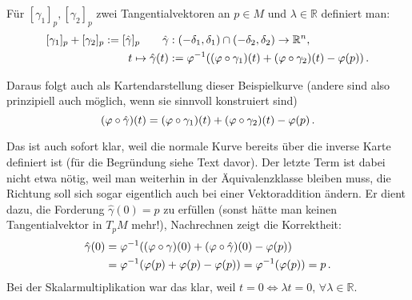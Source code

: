 \documentclass[../H_Analysis_main.tex]{subfiles}
\begin{document}
\begin{itemize}
\begin{defi}[Addition]
Für $[\gamma_1]_p, [\gamma_2]_p$ zwei Tangentialvektoren an $p \in M$ und $\lambda \in \mathbb{R}$ definiert man:
\begin{equation}
\begin{split}
[\gamma_1]_p + [\gamma_2]_p := [\hat{\gamma}]_p \qquad \hat{\gamma}&: (-\delta_1, \delta_1) \cap (-\delta_2, \delta_2) \rightarrow \mathbb{R}^n,
\\
t \mapsto \hat{\gamma}(t) &:= \varphi^{-1}\qty(\qty(\varphi \circ \gamma_1)(t) + \qty(\varphi \circ \gamma_2)(t) - \varphi(p)) \, .
\end{split}
\end{equation}
\end{defi}

Daraus folgt auch als Kartendarstellung dieser Beispielkurve (andere sind also prinzipiell auch möglich, wenn sie sinnvoll konstruiert sind)
\begin{equation*}
\qty(\varphi \circ \hat{\gamma})(t) = \qty(\varphi \circ \gamma_1)(t) + \qty(\varphi \circ \gamma_2)(t) - \varphi(p) \, .
\end{equation*}

Das ist auch sofort klar, weil die normale Kurve bereits über die inverse Karte definiert ist (für die Begründung siehe Text davor).
Der letzte Term ist dabei nicht etwa nötig, weil man weiterhin in der Äquivalenzklasse bleiben muss, die Richtung soll sich sogar eigentlich auch bei einer Vektoraddition ändern. Er dient dazu, die Forderung $\hat{\gamma}(0) = p$ zu erfüllen (sonst hätte man keinen Tangentialvektor in $T_p M$ mehr!), Nachrechnen zeigt die Korrektheit:
\begin{align*}
\hat{\gamma}(0) &= \varphi^{-1}\qty(\qty(\varphi \circ \gamma)(0) + \qty(\varphi \circ \hat{\gamma})(0) - \varphi(p))
\\
&= \varphi^{-1}\qty(\varphi(p) + \varphi(p) - \varphi(p)) = \varphi^{-1}\qty(\varphi(p)) = p \, .
\end{align*}
Bei der Skalarmultiplikation war das klar, weil $t = 0 \Leftrightarrow \lambda t = 0, \, \forall \lambda \in \mathbb{R}$.
\end{itemize}
\end{document}
